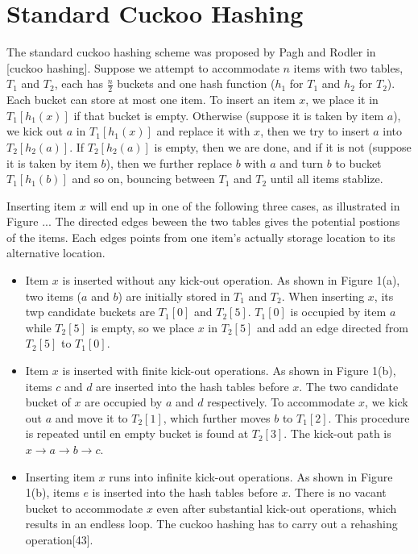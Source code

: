 \documentclass[runningheads]{llncs}
\begin{document}
\section{Standard Cuckoo Hashing}
\label{sec:cuckoo}
The standard cuckoo hashing scheme was proposed by Pagh and Rodler in [cuckoo hashing]. Suppose we attempt to accommodate $n$ items with two tables, $T_1$ and $T_2$, each has $\frac{n}{2}$ buckets and one hash function ($h_1$ for $T_1$ and $h_2$ for $T_2$). Each bucket can store at most one item. To insert an item $x$, we place it in $T_1[h_1(x)]$ if that bucket is empty. Otherwise (suppose it is taken by item $a$), we kick out $a$ in $T_1[h_1(x)]$ and replace it with $x$, then we try to insert $a$ into $T_2[h_2(a)]$. If $T_2[h_2(a)]$ is empty, then we are done, and if it is not (suppose it is taken by item $b$), then we further replace $b$ with $a$ and turn $b$ to bucket $T_1[h_1(b)]$ and so on, bouncing between $T_1$ and $T_2$ until all items stablize.

Inserting item $x$ will end up in one of the following three cases, as illustrated in Figure ... The directed edges beween the two tables gives the potential postions of the items. Each edges points from one item's actually storage location to its alternative location.

\begin{itemize}
    \item Item $x$ is inserted without any kick-out operation. As shown in Figure 1(a), two items ($a$ and $b$) are initially stored in $T_1$ and $T_2$. When inserting $x$, its twp candidate buckets are $T_1[0]$ and $T_2[5]$. $T_1[0]$ is occupied by item $a$ while $T_2[5]$ is empty, so we place $x$ in $T_2[5]$ and add an edge directed from $T_2[5]$ to $T_1[0]$.
    \item Item $x$ is inserted with finite kick-out operations. As shown in Figure 1(b), items $c$ and $d$ are inserted into the hash tables before $x$. The two candidate bucket of $x$ are occupied by $a$ and $d$ respectively. To accommodate $x$, we kick out $a$ and move it to $T_2[1]$, which further moves $b$ to $T_1[2]$. This procedure is repeated until en empty bucket is found at $T_2[3]$. The kick-out path is $x\rightarrow a\rightarrow b\rightarrow c$.
    \item Inserting item $x$ runs into infinite kick-out operations. As shown in Figure 1(b), items $e$ is inserted into the hash tables before $x$. There is no vacant bucket to accommodate $x$ even after substantial kick-out operations, which results in an endless loop. The cuckoo hashing has to carry out a rehashing operation[43].
\end{itemize}
\end{document}
